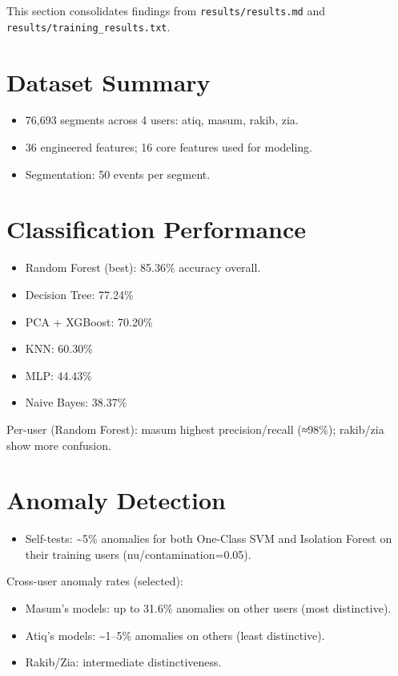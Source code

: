 \documentclass[
  12pt,
  a4paper,
]{report}
\providecommand{\tightlist}{%
  \setlength{\itemsep}{0pt}\setlength{\parskip}{0pt}}
\begin{document}
This section consolidates findings from \texttt{results/results.md} and
\texttt{results/training\_results.txt}.

\section{Dataset Summary}\label{dataset-summary}

\begin{itemize}
\tightlist
\item
  76,693 segments across 4 users: atiq, masum, rakib, zia.
\item
  36 engineered features; 16 core features used for modeling.
\item
  Segmentation: 50 events per segment.
\end{itemize}

\section{Classification Performance}\label{classification-performance}

\begin{itemize}
\tightlist
\item
  Random Forest (best): 85.36\% accuracy overall.
\item
  Decision Tree: 77.24\%
\item
  PCA + XGBoost: 70.20\%
\item
  KNN: 60.30\%
\item
  MLP: 44.43\%
\item
  Naive Bayes: 38.37\%
\end{itemize}

Per-user (Random Forest): masum highest precision/recall (≈98\%);
rakib/zia show more confusion.

\section{Anomaly Detection}\label{anomaly-detection}

\begin{itemize}
\tightlist
\item
  Self-tests: \textasciitilde5\% anomalies for both One-Class SVM and
  Isolation Forest on their training users (nu/contamination=0.05).
\end{itemize}

Cross-user anomaly rates (selected):

\begin{itemize}
\tightlist
\item
  Masum's models: up to 31.6\% anomalies on other users (most
  distinctive).
\item
  Atiq's models: \textasciitilde1--5\% anomalies on others (least
  distinctive).
\item
  Rakib/Zia: intermediate distinctiveness.
\end{itemize}
\end{document}
